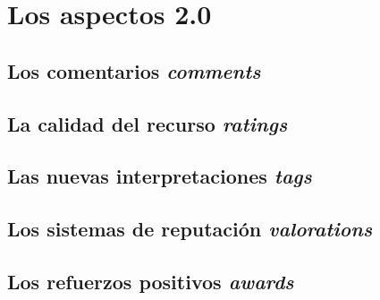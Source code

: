 \chapter{Los aspectos 2.0}

\section{Los comentarios \emph{comments}}
\section{La calidad del recurso \emph{ratings}}
\section{Las nuevas interpretaciones \emph{tags}}
\section{Los sistemas de reputación \emph{valorations}}
\section{Los refuerzos positivos \emph{awards}}
